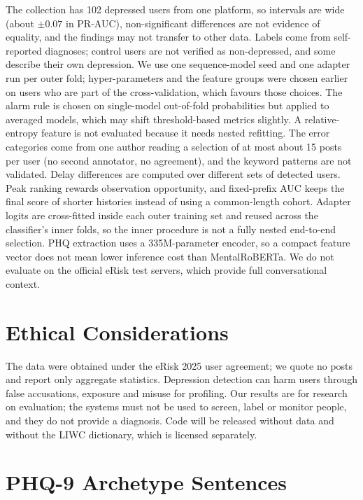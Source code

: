 \documentclass[11pt]{article}
\begin{document}
The collection has 102 depressed users from one platform, so intervals are wide (about $\pm0.07$ in PR-AUC), non-significant differences are not evidence of equality, and the findings may not transfer to other data.
Labels come from self-reported diagnoses; control users are not verified as non-depressed, and some describe their own depression.
We use one sequence-model seed and one adapter run per outer fold; hyper-parameters and the feature groups were chosen earlier on users who are part of the cross-validation, which favours those choices.
The alarm rule is chosen on single-model out-of-fold probabilities but applied to averaged models, which may shift threshold-based metrics slightly.
A relative-entropy feature is not evaluated because it needs nested refitting.
The error categories come from one author reading a selection of at most about 15 posts per user (no second annotator, no agreement), and the keyword patterns are not validated.
Delay differences are computed over different sets of detected users.
Peak ranking rewards observation opportunity, and fixed-prefix AUC keeps the final score of shorter histories instead of using a common-length cohort.
Adapter logits are cross-fitted inside each outer training set and reused across the classifier's inner folds, so the inner procedure is not a fully nested end-to-end selection.
PHQ extraction uses a 335M-parameter encoder, so a compact feature vector does not mean lower inference cost than MentalRoBERTa.
We do not evaluate on the official eRisk test servers, which provide full conversational context.

\section*{Ethical Considerations}

The data were obtained under the eRisk 2025 user agreement; we quote no posts and report only aggregate statistics.
Depression detection can harm users through false accusations, exposure and misuse for profiling.
Our results are for research on evaluation; the systems must not be used to screen, label or monitor people, and they do not provide a diagnosis.
Code will be released without data and without the LIWC dictionary, which is licensed separately.



\appendix

\section{PHQ-9 Archetype Sentences}
\label{app:phq}
\end{document}
